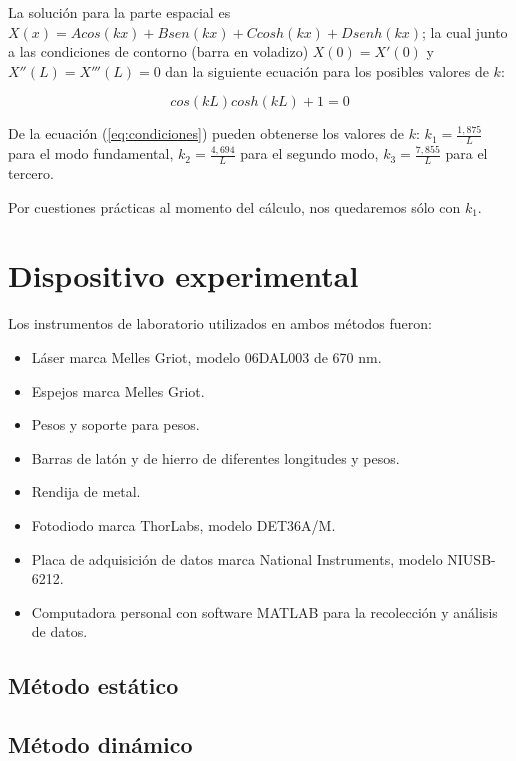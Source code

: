 \documentclass[twoside,twocolumn,a4paper]{article}
\begin{document}
La soluci\'on para la parte espacial es $X(x) = Acos(kx) + Bsen(kx) + Ccosh(kx) + Dsenh(kx)$; la cual junto a las condiciones de contorno (barra en voladizo) $X(0) = X'(0)$ y $X''(L) = X'''(L) = 0$ dan la siguiente ecuaci\'on para los posibles valores de $k$:

\begin{equation}
\label{eq:condiciones}
cos(kL)cosh(kL) + 1 = 0
\end{equation}

De la ecuaci\'on (\ref{eq:condiciones}) pueden obtenerse los valores de $k$:  $k_{1} = \frac{1,875}{L}$ para el modo fundamental, $k_{2} = \frac{4,694}{L}$ para el segundo modo, $k_{3} = \frac{7,855}{L}$ para el tercero.

Por cuestiones pr\'acticas al momento del c\'alculo, nos quedaremos s\'olo con $k_{1}$.



\section{Dispositivo experimental}

Los instrumentos de laboratorio utilizados en ambos m\'etodos fueron:
\begin{itemize}
\item 
\label{Laser} L\'aser marca Melles Griot, modelo 06DAL003 de 670 nm.
\item Espejos marca Melles Griot.
\item Pesos y soporte para pesos.
\item Barras de lat\'on y de hierro de diferentes longitudes y pesos.
\item Rendija de metal.
\item Fotodiodo marca ThorLabs, modelo DET36A/M.
\item Placa de adquisici\'on de datos marca National Instruments, modelo NIUSB-6212.
\item Computadora personal con software MATLAB para la recolecci\'on y an\'alisis de datos.
\end{itemize}

\subsection{M\'etodo est\'atico}

\subsection{M\'etodo din\'amico}
\end{document}
